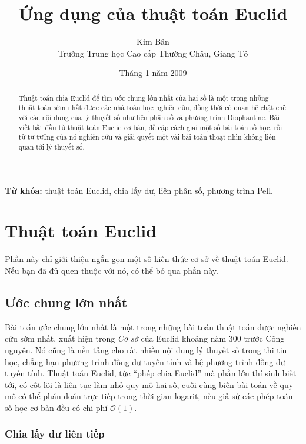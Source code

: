 \documentclass[11pt]{article}
\title{Ứng dụng của thuật toán Euclid}
\author{Kim Bân\\Trường Trung học Cao cấp Thường Châu, Giang Tô}
\date{Tháng 1 năm 2009}
\newcommand{\Oh}{\mathcal{O}}
\begin{document}
\maketitle


\begin{abstract}
Thuật toán chia Euclid để tìm ước chung lớn nhất của hai số là một trong
những thuật toán sớm nhất được các nhà toán học nghiên cứu, đồng thời có quan
hệ chặt chẽ với các nội dung của lý thuyết số như liên phân số và phương
trình Diophantine. Bài viết bắt đầu từ thuật toán Euclid cơ bản, đề cập cách
giải một số bài toán số học, rồi từ tư tưởng của nó nghiên cứu và giải quyết
một vài bài toán thoạt nhìn không liên quan tới lý thuyết số.
\end{abstract}

\noindent\textbf{Từ khóa:} thuật toán Euclid, chia lấy dư, liên phân số,
phương trình Pell.

\tableofcontents

\section{Thuật toán Euclid}

Phần này chỉ giới thiệu ngắn gọn một số kiến thức cơ sở về thuật toán Euclid.
Nếu bạn đã đủ quen thuộc với nó, có thể bỏ qua phần này.

\subsection{Ước chung lớn nhất}

Bài toán ước chung lớn nhất là một trong những bài toán thuật toán được nghiên
cứu sớm nhất, xuất hiện trong \textit{Cơ sở} của Euclid khoảng năm 300 trước
Công nguyên. Nó cũng là nền tảng cho rất nhiều nội dung lý thuyết số trong thi
tin học, chẳng hạn phương trình đồng dư tuyến tính và hệ phương trình đồng dư
tuyến tính. Thuật toán Euclid, tức ``phép chia Euclid'' mà phần lớn thí sinh
biết tới, có cốt lõi là liên tục làm nhỏ quy mô hai số, cuối cùng biến bài
toán về quy mô có thể phán đoán trực tiếp trong thời gian logarit, nếu giả sử
các phép toán số học cơ bản đều có chi phí $\Oh(1)$.

\subsubsection{Chia lấy dư liên tiếp}
\end{document}
